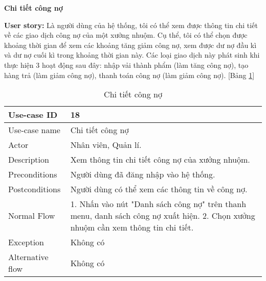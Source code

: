 \textbf{Chi tiết công nợ}\par
\textbf{User story:} Là người dùng của hệ thống, tôi có thể xem được thông tin chi tiết về các giao dịch công nợ của một xưởng nhuộm. Cụ thể, tôi có thể chọn được khoảng thời gian để xem các khoảng tăng giảm công nợ, xem được dư nợ đầu kì và dư nợ cuối kì trong khoảng thời gian này. Các loại giao dịch này phát sinh khi thực hiện 3 hoạt động sau đây: nhập vải thành phẩm (làm tăng công nợ), tạo hàng trả (làm giảm công nợ), thanh toán công nợ (làm giảm công nợ). [Bảng \ref{bang18}]
\begin{table}[H]
    \centering
    \begin{tabular}{|m{3cm}|m{10cm}|}
    \hline 
        Use-case ID & 18\\ \hline
        Use-case name & Chi tiết công nợ\\ \hline
        Actor & Nhân viên, Quản lí.\\ \hline
        Description & Xem thông tin chi tiết công nợ của xưởng nhuộm.\\ \hline
        Preconditions & Người dùng đã đăng nhập vào hệ thống.\\ \hline
        Postconditions & Người dùng có thể xem các thông tin về công nợ.\\ \hline
        Normal Flow & 
        1. Nhấn vào nút "Danh sách công nợ" trên thanh menu, danh sách công nợ xuất hiện.
        2. Chọn xưởng nhuộm cần xem thông tin chi tiết.
        \\ \hline
        Exception & Không có\\ \hline
        Alternative flow & Không có\\ 
    \hline 
    \end{tabular}
    \caption{Chi tiết công nợ}
    \label{bang18}
\end{table}

